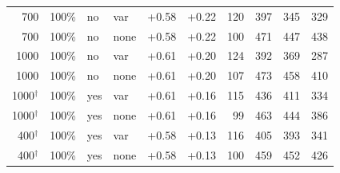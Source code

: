 \begin{table}[!ht]
\begin{tabular}{rrllrrrrrr}
700 & 100\% & no & var & +0.58 & +0.22 & 120 & 397 & 345 & 329 \\
700 & 100\% & no & none & +0.58 & +0.22 & 100 & 471 & 447 & 438 \\
1000 & 100\% & no & var & +0.61 & +0.20 & 124 & 392 & 369 & 287 \\
1000 & 100\% & no & none & +0.61 & +0.20 & 107 & 473 & 458 & 410 \\
1000$^{\dagger}$ & 100\% & yes & var & +0.61 & +0.16 & 115 & 436 & 411 & 334 \\
1000$^{\dagger}$ & 100\% & yes & none & +0.61 & +0.16 & 99 & 463 & 444 & 386 \\
400$^{\dagger}$ & 100\% & yes & var & +0.58 & +0.13 & 116 & 405 & 393 & 341 \\
400$^{\dagger}$ & 100\% & yes & none & +0.58 & +0.13 & 100 & 459 & 452 & 426 \\
\bottomrule
\end{tabular}
\end{table}
